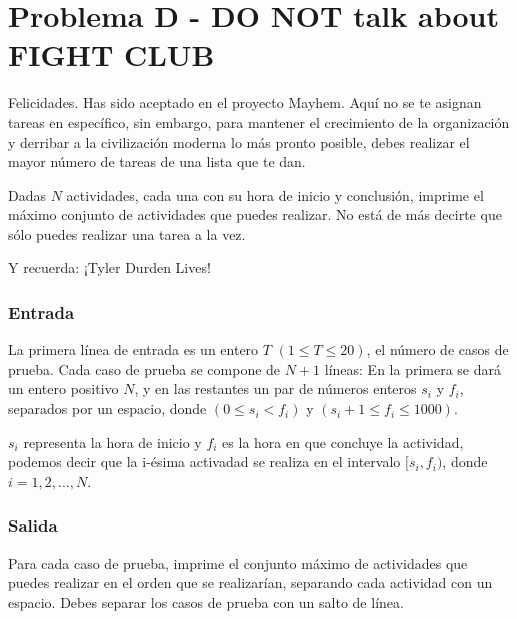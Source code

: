 \chapter*{Problema D - DO NOT talk about FIGHT CLUB}



Felicidades. Has sido aceptado en el proyecto Mayhem. Aquí no se te asignan tareas en específico,
sin embargo, para mantener el crecimiento de la organización y derribar a la civilización moderna lo más pronto posible, debes realizar el mayor número de tareas de una lista que te dan.

Dadas $N$ actividades, cada una con su hora de inicio y conclusión, imprime el máximo conjunto de actividades que puedes realizar. No está de más decirte que sólo puedes realizar una tarea a la vez.

Y recuerda: ¡Tyler Durden Lives!


\subsection*{Entrada}

La primera línea de entrada es un entero $T$ $(1 \leq T \leq 20)$, el número de casos de prueba.
Cada caso de prueba se compone de $N+1$ líneas: En la primera se dará un entero positivo $N$, y en las restantes un par de números enteros $s_i$ y $f_i$, separados por un espacio, donde $(0 \leq s_i < f_i)$ y $(s_i + 1 \leq f_i \leq 1000)$.

$s_i$ representa la hora de inicio y $f_i$ es la hora en que concluye la actividad, podemos decir que la i-ésima activadad se realiza en el intervalo $[s_i, f_i)$, donde $i=1,2,...,N$.


\subsection*{Salida}

Para cada caso de prueba, imprime el conjunto máximo de actividades que puedes realizar en el orden que se realizarían, separando cada actividad con un espacio.
Debes separar los casos de prueba con un salto de línea.



